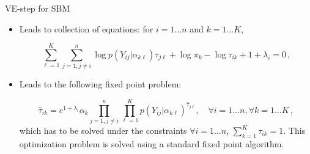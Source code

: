 \documentclass[compress,10pt]{beamer}
\begin{document}
\begin{frame}[allowframebreaks]{VE-step for SBM}
\begin{itemize}
 
 
\item Leads  to collection of equations:  for $i=1\dots n$ and $k=1\dots K$,

 \begin{equation}
  \nonumber
 \sum_{\ell=1}^K \sum_{j=1, j\neq i}^n  \log p(Y_{ij} | \alpha_{k\ell})\tau_{j\ell}   +   \log\pi_{k}  -   \log \tau_{ik} +1 + \lambda_i=0\,,
 \end{equation}
 
 \item Leads to the following fixed point problem:

 \begin{equation}
  \nonumber
  \widehat{\tau}_{ik} = e^{1+ \lambda_i} \alpha_k \prod_{j=1, j\neq i}^n \prod_{\ell=1}^K p(Y_{ij} | \alpha_{k\ell}) ^{\widehat{\tau}_{j\ell}}, \quad \forall  i =1 \dots n,  \forall  k=1 \dots K\,,
 \end{equation}
 which has to be solved under the constraints $\forall i =1 \dots n$, $\sum_{k=1}^K \tau_{ik}=1$. This optimization  problem is solved using a  standard fixed point algorithm.

 \end{itemize}
 
 \end{frame}
 
\end{document}
